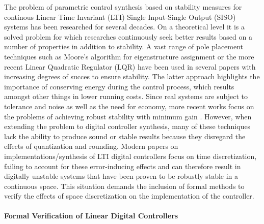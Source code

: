 \documentclass{sig-alternate-05-2015}
\begin{document}
The problem of parametric control synthesis based on stability measures for continous Linear Time Invariant (LTI) Single Input-Single Output (SISO) systems has been researched for several decades. On a theoretical level it is a solved problem\cite{wonham1967pole} for which researches continuously seek better results based on a number of properties in addition to stability. A vast range of pole placement techniques such as Moore's algorithm for eigenstructure assignment \cite{klein1977eigenvalue} or the more recent Linear Quadratic Regulator (LQR) \cite{bemporad2002explicit} have been used in several papers with increasing degrees of succes to ensure stability. The latter approach highlights the importance of conserving energy during the control process, which results amongst other things in lower running costs. Since real systems are subject to tolerance and noise as well as the need for economy, more recent works focus on the problems of achieving robust stability with minimum gain \cite{schmid2014unified,konigorski2012pole}. 
However, when extending the problem to digital controller synthesis, many of these techniques lack the ability to produce sound or stable results because they disregard the effects of quantization and rounding. Modern papers on implementations/synthesis of LTI digital controllers \cite{das2013lqr,ghosh2013fpga} focus on time discretization, failing to account for these error-inducing effects and can therefore result in digitally unstable systems that have been proven to be robustly stable in a continuous space. This situation demands the inclusion of formal methods to verify the effects of space discretization on the implementation of the controller.

\paragraph{Formal Verification of Linear Digital Controllers} 
\end{document}
